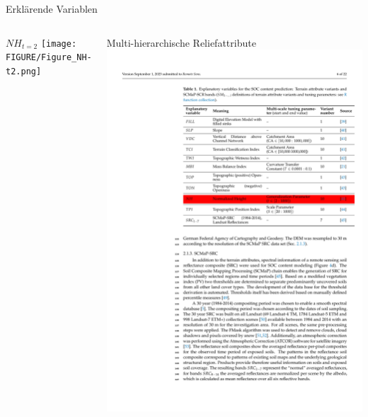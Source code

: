 \begin{frame}{Erklärende Variablen}
\begin{columns}
 \column{4cm}
 \begin{block}{$NH_{t=2}$}
 \centering\texttt{[image: FIGURE/Figure\_NH-t2.png]}
\end{block}
 \column{7cm}
 \begin{block}{Multi-hierarchische Reliefattribute}
 \centering\includegraphics[width=1\textwidth]{FIGURE/Table_TerrainAttributes.pdf}
 \end{block}
  \end{columns}
\end{frame}


